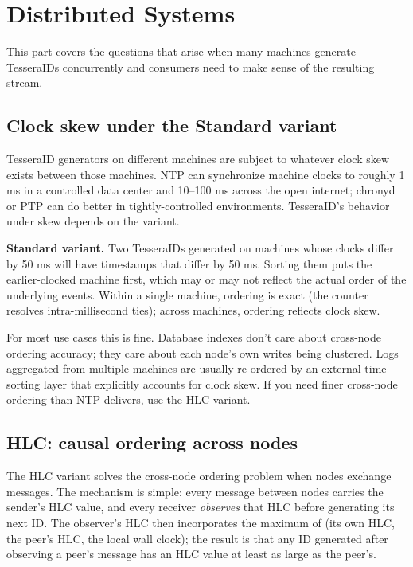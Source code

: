 \section{Distributed Systems}
\label{sec:distributed}

This part covers the questions that arise when many machines generate TesseraIDs concurrently and consumers need to make sense of the resulting stream.

\subsection{Clock skew under the Standard variant}

TesseraID generators on different machines are subject to whatever clock skew exists between those machines. NTP \citep{rfc5905} can synchronize machine clocks to roughly 1 ms in a controlled data center and 10--100 ms across the open internet; chronyd or PTP \citep{ieee1588} can do better in tightly-controlled environments. TesseraID's behavior under skew depends on the variant.

\textbf{Standard variant.} Two TesseraIDs generated on machines whose clocks differ by 50 ms will have timestamps that differ by 50 ms. Sorting them puts the earlier-clocked machine first, which may or may not reflect the actual order of the underlying events. Within a single machine, ordering is exact (the counter resolves intra-millisecond ties); across machines, ordering reflects clock skew.

For most use cases this is fine. Database indexes don't care about cross-node ordering accuracy; they care about each node's own writes being clustered. Logs aggregated from multiple machines are usually re-ordered by an external time-sorting layer that explicitly accounts for clock skew. If you need finer cross-node ordering than NTP delivers, use the HLC variant.

\subsection{HLC: causal ordering across nodes}

The HLC variant solves the cross-node ordering problem when nodes exchange messages. The mechanism is simple: every message between nodes carries the sender's HLC value, and every receiver \emph{observes} that HLC before generating its next ID. The observer's HLC then incorporates the maximum of (its own HLC, the peer's HLC, the local wall clock); the result is that any ID generated after observing a peer's message has an HLC value at least as large as the peer's.

